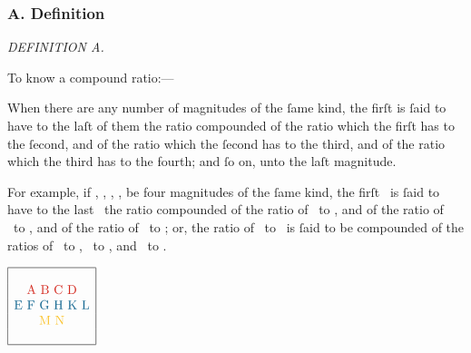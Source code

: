 \documentclass[11pt,preview]{standalone}
\begin{document}
\subsubsection{A. Definition}

\newcommand{\redA}{{\color{cred}{A}}}
\newcommand{\redB}{{\color{cred}{B}}}
\newcommand{\redC}{{\color{cred}{C}}}
\newcommand{\redD}{{\color{cred}{D}}}

\newcommand{\blueE}{{\color{cblue}{E}}}
\newcommand{\blueF}{{\color{cblue}{F}}}
\newcommand{\blueG}{{\color{cblue}{G}}}
\newcommand{\blueH}{{\color{cblue}{H}}}
\newcommand{\blueK}{{\color{cblue}{K}}}
\newcommand{\blueL}{{\color{cblue}{L}}}

\newcommand{\yellowM}{{\color{cyellow}{M}}}
\newcommand{\yellowN}{{\color{cyellow}{N}}}
\newcommand{\yellowC}{{\color{cyellow}{C}}}
\newcommand{\yellowD}{{\color{cyellow}{D}}}

\begin{minipage}{\textwidth}
    \begin{center}
        \textit{DEFINITION A.}\label{book5defA} \\
    \end{center}

    \hfill
\end{minipage}

\raggedright To know a compound ratio:---

When there are any number of magnitudes of the ſame kind, the firſt is ſaid to have to the laſt of them the ratio compounded of the ratio which the firſt has to the ſecond, and of the ratio which the ſecond has to the third, and of the ratio which the third has to the fourth; and ſo on, unto the laſt magnitude.

\begin{minipage}{0.75\textwidth}
    For example, if \redA, \redB, \redC, \redD, be four magnitudes of the ſame kind, the firſt \redA\ is ſaid to have to the last \redD\ the ratio compounded of the ratio of \redA\ to \redB, and of the ratio of \redB\ to \redC, and of the ratio of \redC\ to \redD; or, the ratio of \redA\ to \redD\ is ſaid to be compounded of the ratios of \redA\ to \redB, \redB\ to \redC, and \redC\ to \redD.
\end{minipage}%
\begin{minipage}{0.25\textwidth}
    \hspace{4ex}$\begin{array}{|c|} \hline\\ \text{\redA}\ \text{\redB}\ \text{\redC}\ \text{\redD} \\ \text{\blueE}\ \text{\blueF}\ \text{\blueG}\ \text{\blueH}\ \text{\blueK}\ \text{\blueL} \\ \text{\yellowM}\ \text{\yellowN} \\ \\ \hline \end{array}$
\end{minipage}
\end{document}
